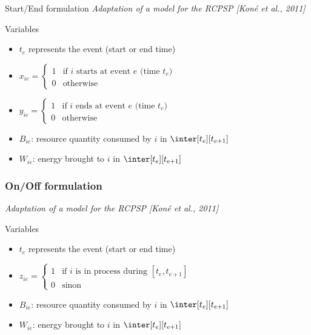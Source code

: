 \begin{frame}{Start/End formulation}
  {\small \it Adaptation of a model for the RCPSP {\color{gray!50!black!50} \it [Koné et al., 2011]}}
  \vfill
  \begin{block}{Variables}
    \begin{itemize}
    \item  $t_e$ represents the event (start or end time)
\pause
      \vspace{0.3cm}
    \item $x_{ie}=\left\{
        \begin{array}{ll}
          1 & \text{if $i$ starts at event $e$ (time $t_e$)}\\
          0 & \text{otherwise}
        \end{array}
      \right.
      $
\pause
      \vspace{0.3cm}
    \item $y_{ie}=\left\{
        \begin{array}{ll}
          1 & \text{if $i$ ends at event $e$ (time $t_e$)}\\
          0 & \text{otherwise}
        \end{array}
      \right.
      $
      \vspace{0.3cm}
\pause
    \item $B_{ie}$: resource quantity consumed by $i$ in $\inter[t_e][t_{e+1}]$
      \vspace{0.3cm}
\pause
    \item $W_{ie}$: energy brought to $i$ in $\inter[t_e][t_{e+1}]$   
    \end{itemize}
  \end{block}
\end{frame}


\begin{frame}
  \frametitle{On/Off formulation}
  {\small \it Adaptation of a model for the RCPSP {\color{gray!50!black!50} \it [Koné et al., 2011]}}
  \vfill
  \begin{block}{Variables}
    \begin{itemize}
    \item  $t_e$ represents the event (start or end time)
\pause
      \vspace{0.3cm}
    \item $z_{ie}=\left\{
        \begin{array}{ll}
          1 & \text{if $i$ is in process during $[t_{e},t_{e+1}]$}\\
          0 & \text{sinon}
        \end{array}
      \right.
      $
\pause
      \vspace{0.3cm}
    \item $B_{ie}$: resource quantity consumed by $i$ in $\inter[t_e][t_{e+1}]$
      \vspace{0.3cm}
    \item $W_{ie}$: energy brought to $i$ in $\inter[t_e][t_{e+1}]$   
    \end{itemize}
  \end{block}
\end{frame}

